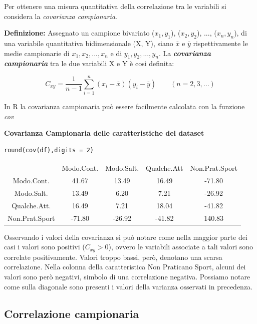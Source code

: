 Per ottenere una misura quantitativa della correlazione tra le variabili si considera la \textit{covarianza campionaria}.

\noindent \textbf{Definizione:} Assegnato un campione bivariato ($x_1, y_1$), ($x_2, y_2$), ..., ($x_n, y_n$), di una variabile quantitativa bidimensionale (X, Y), siano $\bar x$ e $\bar y$ rispettivamente le medie campionarie di $x_1, x_2, ..., x_n$ e di $y_1, y_2, ..., y_n$. La \textbf{\textit{covarianza campionaria}} tra le due variabili X e Y è così definita:

\[C_{xy} = \frac{1}{n-1} \sum_{i=1}^n (x_i - \bar x)(y_i - \bar y) \quad \quad (n = 2, 3, ...)\]

In R la covarianza campionaria può essere facilmente calcolata con la funzione \textit{cov}

\vspace{5mm}
\noindent \textbf{Covarianza Campionaria delle caratteristiche del dataset}

\vspace{5mm}
\begin{lstlisting}
round(cov(df),digits = 2)
\end{lstlisting}
\vspace{5mm}

\vspace{5mm}
\begin{tabular}{c c c c c}
 & Modo.Cont. & Modo.Salt. & Qualche.Att & Non.Prat.Sport\\
 Modo.Cont. & 41.67 & 13.49 & 16.49 & -71.80\\
 Modo.Salt. & 13.49 & 6.20 & 7.21 & -26.92\\
 Qualche.Att. & 16.49 & 7.21 & 18.04 & -41.82\\
 Non.Prat.Sport & -71.80 & -26.92 & -41.82 & 140.83\\
\end{tabular}
\vspace{5mm}

Osservando i valori della covarianza si può notare come nella maggior parte dei casi i valori sono positivi ($C_{xy} > 0$), ovvero le variabili associate a tali valori sono correlate positivamente. Valori troppo bassi, però, denotano una scarsa correlazione. Nella colonna della caratteristica Non Praticano Sport, alcuni dei valori sono però negativi, simbolo di una correlazione negativa. Possiamo notare come sulla diagonale sono presenti i valori della varianza osservati in precedenza.

\subsection{Correlazione campionaria}\label{cap4.1.2}

